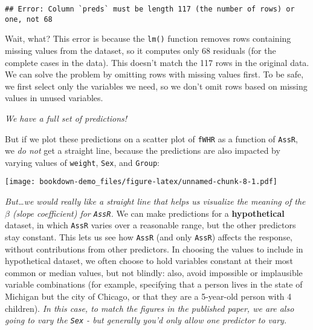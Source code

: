 \documentclass[]{book}
\newenvironment{Shaded}{\begin{snugshade}}{\end{snugshade}}
\newcommand{\DataTypeTok}[1]{\textcolor[rgb]{0.13,0.29,0.53}{#1}}
\newcommand{\KeywordTok}[1]{\textcolor[rgb]{0.13,0.29,0.53}{\textbf{#1}}}
\newcommand{\NormalTok}[1]{#1}
\newcommand{\OperatorTok}[1]{\textcolor[rgb]{0.81,0.36,0.00}{\textbf{#1}}}
\newcommand{\StringTok}[1]{\textcolor[rgb]{0.31,0.60,0.02}{#1}}
\begin{document}
\begin{verbatim}
## Error: Column `preds` must be length 117 (the number of rows) or one, not 68
\end{verbatim}

Wait, what? This error is because the \texttt{lm()} function removes rows containing missing values from the dataset, so it computes only 68 residuals (for the complete cases in the data). This doesn't match the 117 rows in the original data. We can solve the problem by omitting rows with missing values first. To be safe, we first select only the variables we need, so we don't omit rows based on missing values in unused variables.

\begin{Shaded}
\end{Shaded}

\emph{We have a full set of predictions!}

But if we plot these predictions on a scatter plot of \texttt{fWHR} as a function of \texttt{AssR}, we \emph{do not} get a straight line, because the predictions are also impacted by varying values of \texttt{weight}, \texttt{Sex}, and \texttt{Group}:

\begin{Shaded}
\end{Shaded}

\texttt{[image: bookdown-demo\_files/figure-latex/unnamed-chunk-8-1.pdf]}

\emph{But\ldots we would really like a straight line that helps us visualize the meaning of the \(\beta\) (slope coefficient) for \texttt{AssR}.} We can make predictions for a \textbf{hypothetical} dataset, in which \texttt{AssR} varies over a reasonable range, but the other predictors stay constant. This lets us see how \texttt{AssR} (and only \texttt{AssR}) affects the response, without contributions from other predictors. In choosing the values to include in hypothetical dataset, we often choose to hold variables constant at their most common or median values, but not blindly: also, avoid impossible or implausible variable combinations (for example, specifying that a person lives in the state of Michigan but the city of Chicago, or that they are a 5-year-old person with 4 children). \emph{In this case, to match the figures in the published paper, we are also going to vary the \texttt{Sex} - but generally you'd only allow one predictor to vary.}
\end{document}
